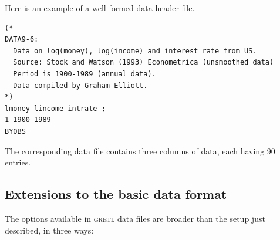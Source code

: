 \documentclass{article}
\begin{document}
Here is an example of a well-formed data header file.

\begin{verbatim}
(*
DATA9-6:
  Data on log(money), log(income) and interest rate from US.
  Source: Stock and Watson (1993) Econometrica (unsmoothed data)
  Period is 1900-1989 (annual data).  
  Data compiled by Graham Elliott.
*)
lmoney lincome intrate ;
1 1900 1989
BYOBS
\end{verbatim}

The corresponding data file contains three columns of data, each
having 90 entries.

\subsection{Extensions to the basic data format}

The options available in \textsc{gretl} data files are broader than
the setup just described, in three ways:
\end{document}
